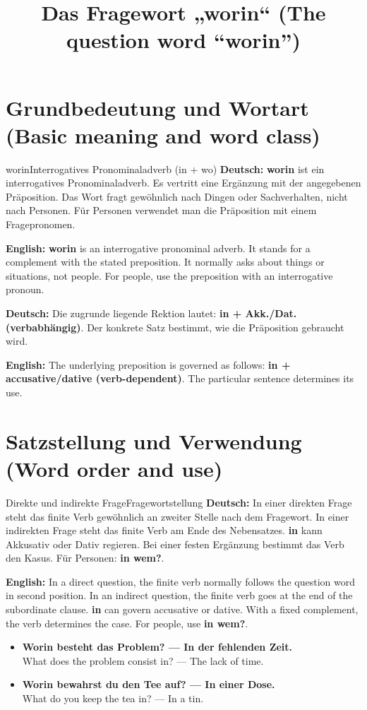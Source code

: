 \documentclass[a4paper,11pt]{article}
\title{Das Fragewort „worin“ (The question word “worin”)}
\date{}
\newcommand{\GermanText}[1]{\textbf{Deutsch: }#1\par}
\newcommand{\EnglishText}[1]{{\small\color{SoftGray}\textbf{English: }#1\par}}
\newcommand{\ExampleItem}[2]{\item \textbf{#1}\\{\small\color{SoftGray}#2}}
\begin{document}
\maketitle
\tableofcontents
\newpage
\section{Grundbedeutung und Wortart (Basic meaning and word class)}
\begin{grammarentry}{worin}{Interrogatives Pronominaladverb (in + wo)}
\GermanText{\textbf{worin} ist ein interrogatives Pronominaladverb. Es vertritt eine Ergänzung mit der angegebenen Präposition. Das Wort fragt gewöhnlich nach Dingen oder Sachverhalten, nicht nach Personen. Für Personen verwendet man die Präposition mit einem Fragepronomen.}
\EnglishText{\textbf{worin} is an interrogative pronominal adverb. It stands for a complement with the stated preposition. It normally asks about things or situations, not people. For people, use the preposition with an interrogative pronoun.}
\GermanText{Die zugrunde liegende Rektion lautet: \textbf{in + Akk./Dat. (verbabhängig)}. Der konkrete Satz bestimmt, wie die Präposition gebraucht wird.}
\EnglishText{The underlying preposition is governed as follows: \textbf{in + accusative/dative (verb-dependent)}. The particular sentence determines its use.}
\end{grammarentry}
\section{Satzstellung und Verwendung (Word order and use)}
\begin{grammarentry}{Direkte und indirekte Frage}{Fragewortstellung}
\GermanText{In einer direkten Frage steht das finite Verb gewöhnlich an zweiter Stelle nach dem Fragewort. In einer indirekten Frage steht das finite Verb am Ende des Nebensatzes. \textbf{in} kann Akkusativ oder Dativ regieren. Bei einer festen Ergänzung bestimmt das Verb den Kasus. Für Personen: \textbf{in wem?}.}
\EnglishText{In a direct question, the finite verb normally follows the question word in second position. In an indirect question, the finite verb goes at the end of the subordinate clause. \textbf{in} can govern accusative or dative. With a fixed complement, the verb determines the case. For people, use \textbf{in wem?}.}
\end{grammarentry}
\begin{exbox}\begin{itemize}
\ExampleItem{Worin besteht das Problem? — In der fehlenden Zeit.}{What does the problem consist in? — The lack of time.}
\ExampleItem{Worin bewahrst du den Tee auf? — In einer Dose.}{What do you keep the tea in? — In a tin.}
\end{itemize}\end{exbox}
\end{document}
